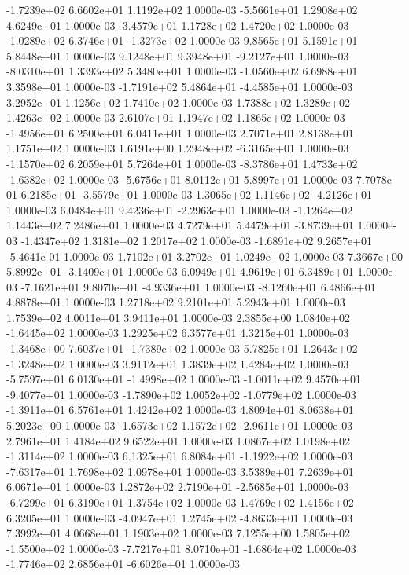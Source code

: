 -1.7239e+02  6.6602e+01  1.1192e+02  1.0000e-03
-5.5661e+01  1.2908e+02  4.6249e+01  1.0000e-03
-3.4579e+01  1.1728e+02  1.4720e+02  1.0000e-03
-1.0289e+02  6.3746e+01 -1.3273e+02  1.0000e-03
9.8565e+01 5.1591e+01 5.8448e+01  1.0000e-03
 9.1248e+01  9.3948e+01 -9.2127e+01  1.0000e-03
-8.0310e+01  1.3393e+02  5.3480e+01  1.0000e-03
-1.0560e+02  6.6988e+01  3.3598e+01  1.0000e-03
-1.7191e+02  5.4864e+01 -4.4585e+01  1.0000e-03
3.2952e+01 1.1256e+02 1.7410e+02  1.0000e-03
1.7388e+02 1.3289e+02 1.4263e+02  1.0000e-03
2.6107e+01 1.1947e+02 1.1865e+02  1.0000e-03
-1.4956e+01  6.2500e+01  6.0411e+01  1.0000e-03
2.7071e+01 2.8138e+01 1.1751e+02  1.0000e-03
 1.6191e+00  1.2948e+02 -6.3165e+01  1.0000e-03
-1.1570e+02  6.2059e+01  5.7264e+01  1.0000e-03
-8.3786e+01  1.4733e+02 -1.6382e+02  1.0000e-03
-5.6756e+01  8.0112e+01  5.8997e+01  1.0000e-03
 7.7078e-01  6.2185e+01 -3.5579e+01  1.0000e-03
 1.3065e+02  1.1146e+02 -4.2126e+01  1.0000e-03
 6.0484e+01  9.4236e+01 -2.2963e+01  1.0000e-03
-1.1264e+02  1.1443e+02  7.2486e+01  1.0000e-03
 4.7279e+01  5.4479e+01 -3.8739e+01  1.0000e-03
-1.4347e+02  1.3181e+02  1.2017e+02  1.0000e-03
-1.6891e+02  9.2657e+01 -5.4641e-01  1.0000e-03
1.7102e+01 3.2702e+01 1.0249e+02  1.0000e-03
 7.3667e+00  5.8992e+01 -3.1409e+01  1.0000e-03
6.0949e+01 4.9619e+01 6.3489e+01  1.0000e-03
-7.1621e+01  9.8070e+01 -4.9336e+01  1.0000e-03
-8.1260e+01  6.4866e+01  4.8878e+01  1.0000e-03
1.2718e+02 9.2101e+01 5.2943e+01  1.0000e-03
1.7539e+02 4.0011e+01 3.9411e+01  1.0000e-03
 2.3855e+00  1.0840e+02 -1.6445e+02  1.0000e-03
1.2925e+02 6.3577e+01 4.3215e+01  1.0000e-03
-1.3468e+00  7.6037e+01 -1.7389e+02  1.0000e-03
 5.7825e+01  1.2643e+02 -1.3248e+02  1.0000e-03
3.9112e+01 1.3839e+02 1.4284e+02  1.0000e-03
-5.7597e+01  6.0130e+01 -1.4998e+02  1.0000e-03
-1.0011e+02  9.4570e+01 -9.4077e+01  1.0000e-03
-1.7890e+02  1.0052e+02 -1.0779e+02  1.0000e-03
-1.3911e+01  6.5761e+01  1.4242e+02  1.0000e-03
4.8094e+01 8.0638e+01 5.2023e+00  1.0000e-03
-1.6573e+02  1.1572e+02 -2.9611e+01  1.0000e-03
2.7961e+01 1.4184e+02 9.6522e+01  1.0000e-03
 1.0867e+02  1.0198e+02 -1.3114e+02  1.0000e-03
 6.1325e+01  6.8084e+01 -1.1922e+02  1.0000e-03
-7.6317e+01  1.7698e+02  1.0978e+01  1.0000e-03
3.5389e+01 7.2639e+01 6.0671e+01  1.0000e-03
 1.2872e+02  2.7190e+01 -2.5685e+01  1.0000e-03
-6.7299e+01  6.3190e+01  1.3754e+02  1.0000e-03
1.4769e+02 1.4156e+02 6.3205e+01  1.0000e-03
-4.0947e+01  1.2745e+02 -4.8633e+01  1.0000e-03
7.3992e+01 4.0668e+01 1.1903e+02  1.0000e-03
 7.1255e+00  1.5805e+02 -1.5500e+02  1.0000e-03
-7.7217e+01  8.0710e+01 -1.6864e+02  1.0000e-03
-1.7746e+02  2.6856e+01 -6.6026e+01  1.0000e-03
